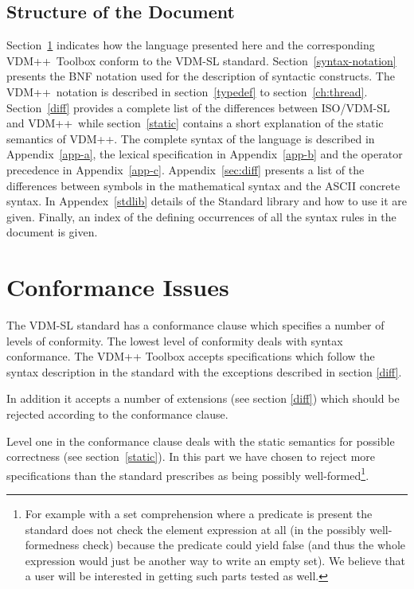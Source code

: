 \documentclass[\pformat,12pt]{article}
\newcommand{\vdmslpp}[2]{%
#2
}
\newcommand{\vdmsl}{VDM-SL}
\newcommand{\vdmpp}{VDM++}
\begin{document}
\subsection{Structure of the Document}

Section~\ref{conformance} indicates how the language presented here
and the corresponding \vdmpp\ Toolbox conform to the VDM-SL
standard.  Section~\ref{syntax-notation} presents the BNF notation
used for the description of syntactic constructs.  The \vdmpp\
notation is described in section~\ref{typedef} to
section~\ref{ch:thread}.  Section~\ref{diff} provides a complete list
of the differences between ISO/VDM-SL and \vdmpp\ while
section~\ref{static} contains a short explanation of the static
semantics of \vdmpp. The complete syntax of the language is described
in Appendix~\ref{app-a}, the lexical specification in
Appendix~\ref{app-b} and the operator precedence in
Appendix~\ref{app-c}. Appendix~\ref{sec:diff} presents a list of the
differences between symbols in the mathematical syntax and the ASCII
concrete syntax. In Appendex~\ref{stdlib} details of the Standard
library and how to use it are given. Finally, an index of the defining
occurrences of all 
the syntax rules in the document is given.


\section{Conformance Issues}
\label{conformance}

The VDM-SL standard has a conformance clause which specifies a number
of levels of conformity. The lowest level of conformity deals with
syntax conformance. The  \vdmslpp{\vdmsl}{\vdmpp} Toolbox accepts
specifications which follow the syntax description in the
\vdmslpp{standard.}{standard with the exceptions described in section
\ref{diff}.}

In addition it accepts a number of extensions (see section \ref{diff})
which should be rejected according to the conformance clause.

Level one in the conformance clause deals with the static semantics
for possible correctness (see section~\ref{static}). 
In this part we have chosen to reject more
specifications than the standard prescribes as being possibly
well-formed\footnote{For example with a set comprehension where a
  predicate is present the standard does not check the element
  expression at all (in the possibly well-formedness check) because
  the predicate could yield false (and thus the whole expression would
  just be another way to write an empty set). We believe that a user
  will be interested in getting such parts tested as well.}.
\end{document}
